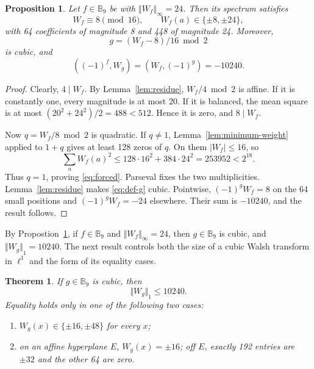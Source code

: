 \documentclass[11pt]{article}
\newtheorem{theorem}{Theorem}
\newtheorem{proposition}{Proposition}
\newtheorem{open problem}{Open problem}
\begin{document}
\begin{proposition}\label{lem:forced}
Let $f\in \mathbb{B}_9$ be with ${\Vert W_f\Vert }_{\infty}=24$. Then its spectrum satisfies
\begin{equation}\label{eq:forced}
W_f\equiv8\pmod{16},\qquad W_f(a)\in\{\pm8,\pm24\},
\end{equation}
with 64 coefficients of magnitude 8 and 448 of magnitude 24. Moreover,
\begin{equation}\label{eq:def-g}
g=(W_f-8)/16\bmod2
\end{equation}
is cubic, and
\begin{equation}\label{eq:correlation}
((-1)^f, W_g)=(W_f, (-1)^g)=-10240.
\end{equation}
\end{proposition}
\begin{proof}
Clearly, $4\mid W_f$. By Lemma~\ref{lem:residue}, $W_f/4\bmod2$ is affine. If it is constantly one, every magnitude is at most 20. If it is balanced, the mean square is at most $(20^2+24^2)/2=488<512$. Hence it is zero, and $8\mid W_f$.

Now $q=W_f/8\bmod2$ is quadratic. If $q\ne1$, Lemma~\ref{lem:minimum-weight} applied to $1+q$ gives at least 128 zeros of $q$. On them $|W_f|\le16$, so
\[
\sum_a W_f(a)^2\le128\cdot 16^2+384\cdot24^2=253952<2^{18}.
\]
Thus $q=1$, proving \eqref{eq:forced}. Parseval fixes the two multiplicities. Lemma~\ref{lem:residue} makes \eqref{eq:def-g} cubic. Pointwise, $(-1)^gW_f=8$ on the 64 small positions and $(-1)^gW_f=-24$ elsewhere. Their sum is $-10240$, and the result follows.
\end{proof}

By Propostion~\ref{lem:forced}, if $f\in \mathbb{B}_9$ and ${\Vert W_f\Vert }_{\infty}=24$, then $g\in \mathbb{B}_9$ is cubic, and ${\Vert W_g\Vert }_{1}=10240$. The next result controls both the size of a cubic Walsh transform in $\ell^1$ and the form of its equality cases.

\begin{theorem}\label{thm:l1}
If $g\in \mathbb{B}_9$ is cubic, then
\begin{equation}\label{eq:l1}
{\Vert W_g\Vert }_{1}\le10240.
\end{equation}
Equality holds only in one of the following two cases:
\begin{enumerate}
\item[(A)] $W_g(x)\in\{\pm16,\pm48\}$ for every $x$;
\item[(B)] on an affine hyperplane $E$, $W_g(x)=\pm16$; off $E$, exactly 192 entries are $\pm32$ and the other 64 are zero.
\end{enumerate}
\end{theorem}
\end{document}
